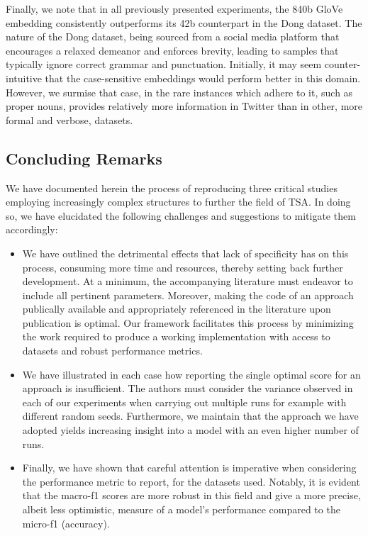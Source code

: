 \documentclass[../../fyp.tex]{subfiles}
\begin{document}
Finally, we note that in all previously presented experiments, the 840b GloVe embedding consistently outperforms its 42b counterpart in the Dong dataset. The nature of the Dong dataset, being sourced from a social media platform that encourages a relaxed demeanor and enforces brevity, leading to samples that typically ignore correct grammar and punctuation. Initially, it may seem counter-intuitive that the case-sensitive embeddings would perform better in this domain. However, we surmise that case, in the rare instances which adhere to it, such as proper nouns, provides relatively more information in Twitter than in other, more formal and verbose, datasets. 

\subsection{Concluding Remarks}
We have documented herein the process of reproducing three critical studies employing increasingly complex structures to further the field of TSA. In doing so, we have elucidated the following challenges and suggestions to mitigate them accordingly: 

\begin{itemize}
	\item We have outlined the detrimental effects that lack of specificity has on this process, consuming more time and resources, thereby setting back further development. At a minimum, the accompanying literature must endeavor to include all pertinent parameters. Moreover, making the code of an approach publically available and appropriately referenced in the literature upon publication is optimal. Our framework facilitates this process by minimizing the work required to produce a working implementation with access to datasets and robust performance metrics.  
	\item We have illustrated in each case how reporting the single optimal score for an approach is insufficient. The authors must consider the variance observed in each of our experiments when carrying out multiple runs for example with different random seeds. Furthermore, we maintain that the approach we have adopted yields increasing insight into a model with an even higher number of runs. 
	\item Finally, we have shown that careful attention is imperative when considering the performance metric to report, for the datasets used. Notably, it is evident that the macro-f1 scores are more robust in this field and give a more precise, albeit less optimistic, measure of a model's performance compared to the micro-f1 (accuracy).
\end{itemize}
\end{document}
